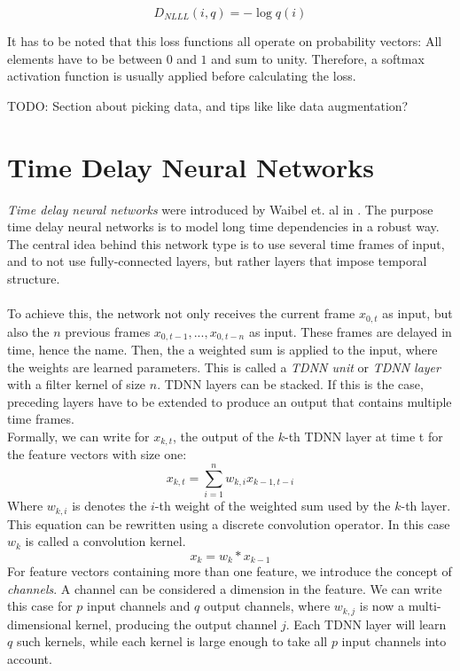 \[
D_{NLLL}(i, q) = -\log q(i)
\]

It has to be noted that this loss functions all operate on probability vectors: All elements have to be between $0$ and $1$ and sum to unity. Therefore, a softmax activation function is usually applied before calculating the loss. 

TODO: Section about picking data, and tips like like data augmentation? 

\section{Time Delay Neural Networks}

\textit{Time delay neural networks} were introduced by Waibel et. al in \cite{waibel1990phoneme}. The purpose time delay neural networks is to model long time dependencies in a robust way. The central idea behind this network type is to use several time frames of input, and to not use fully-connected layers, but rather layers that impose temporal structure. \\ \\
To achieve this, the network not only receives the current frame $x_{0,t}$ as input, but also the $n$ previous frames $x_{0,t - 1}, ..., x_{0,t - n}$ as input. These frames are delayed in time, hence the name. Then, the a weighted sum is applied to the input, where the weights are learned parameters. This is called a \textit{TDNN unit} or \textit{TDNN layer} with a filter kernel of size $n$. TDNN layers can be stacked. If this is the case, preceding layers have to be extended to produce an output that contains multiple time frames. \\
Formally, we can write for $x_{k,t}$, the output of the $k$-th TDNN layer at time t for the feature vectors with size one:
\[
x_{k,t} = \sum_{i = 1}^n w_{k, i} x_{k - 1, t - i}
\]
Where $w_{k, i}$ is denotes the $i$-th weight of the weighted sum used by the $k$-th layer. \\
This equation can be rewritten using a discrete convolution operator. In this case $w_k$ is called a convolution kernel. 
\[
x_{k} = w_{k} * x_{k - 1}
\]
For feature vectors containing more than one feature, we introduce the concept of \textit{channels}. A channel can be considered a dimension in the feature. We can write this case for $p$ input channels and $q$ output channels, where $w_{k, j}$ is now a multi-dimensional kernel, producing the output channel $j$. Each TDNN layer will learn $q$ such kernels, while each kernel is large enough to take all $p$ input channels into account. 

